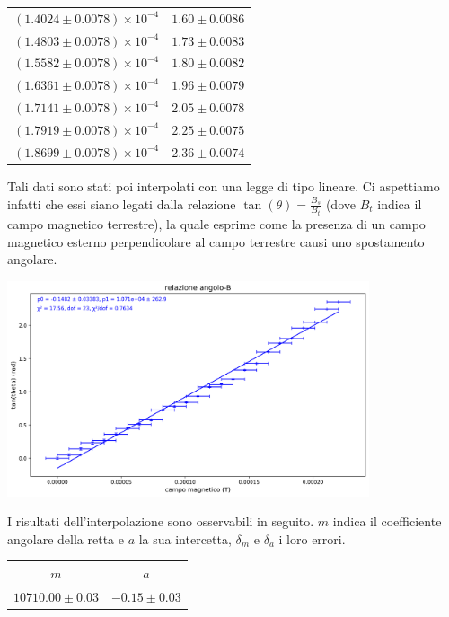 \documentclass[a4paper]{article}
\begin{document}
\begin{center}
\begin{tabular}{|c|c|}
$(1.4024 \pm 0.0078) \times 10^{-4}$ & $1.60 \pm 0.0086$ \\
$(1.4803 \pm 0.0078) \times 10^{-4}$ & $1.73 \pm 0.0083$ \\
$(1.5582 \pm 0.0078) \times 10^{-4}$ & $1.80 \pm 0.0082$ \\
$(1.6361 \pm 0.0078) \times 10^{-4}$ & $1.96 \pm 0.0079$ \\
$(1.7141 \pm 0.0078) \times 10^{-4}$ & $2.05 \pm 0.0078$ \\
$(1.7919 \pm 0.0078) \times 10^{-4}$ & $2.25 \pm 0.0075$ \\
$(1.8699 \pm 0.0078) \times 10^{-4}$ & $2.36 \pm 0.0074$ \\
\hline
\end{tabular}
\end{center}

Tali dati sono stati poi interpolati con una legge di tipo lineare.
Ci aspettiamo infatti che essi siano legati dalla relazione $\tan(\theta) = \frac {B_s}{B_t}$ (dove $B_t$ indica il campo magnetico terrestre),
la quale esprime come la presenza di un campo magnetico esterno perpendicolare al campo terrestre causi uno spostamento angolare.

\begin{center}
    \includegraphics[width=0.8\textwidth]{grafici/campo_magnetico.png}
\end{center}
I risultati dell'interpolazione sono osservabili in seguito. $m$ indica il coefficiente angolare della retta e $a$ la sua intercetta,
$\delta_m$ e $\delta_a$ i loro errori.

\begin{center}
\begin{tabular}{|c|c|}
\hline
$m$ & $a$ \\
\hline
$10710.00 \pm 0.03$ & $-0.15 \pm 0.03$ \\
\hline
\end{tabular}
\end{center}
\end{document}
